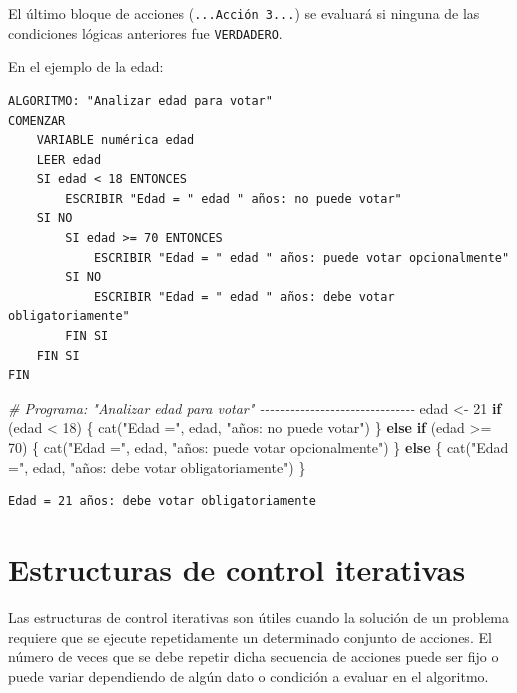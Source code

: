 \documentclass[
]{book}
\newenvironment{Shaded}{\begin{snugshade}}{\end{snugshade}}
\newcommand{\CommentTok}[1]{\textcolor[rgb]{0.56,0.35,0.01}{\textit{#1}}}
\newcommand{\ControlFlowTok}[1]{\textcolor[rgb]{0.13,0.29,0.53}{\textbf{#1}}}
\newcommand{\DecValTok}[1]{\textcolor[rgb]{0.00,0.00,0.81}{#1}}
\newcommand{\FunctionTok}[1]{\textcolor[rgb]{0.00,0.00,0.00}{#1}}
\newcommand{\NormalTok}[1]{#1}
\newcommand{\OtherTok}[1]{\textcolor[rgb]{0.56,0.35,0.01}{#1}}
\newcommand{\SpecialCharTok}[1]{\textcolor[rgb]{0.00,0.00,0.00}{#1}}
\newcommand{\StringTok}[1]{\textcolor[rgb]{0.31,0.60,0.02}{#1}}
\begin{document}
El último bloque de acciones (\texttt{...Acción\ 3...}) se evaluará si ninguna de las condiciones lógicas anteriores fue \texttt{VERDADERO}.

En el ejemplo de la edad:

\begin{verbatim}
ALGORITMO: "Analizar edad para votar"
COMENZAR
    VARIABLE numérica edad
    LEER edad
    SI edad < 18 ENTONCES
        ESCRIBIR "Edad = " edad " años: no puede votar"
    SI NO
        SI edad >= 70 ENTONCES
            ESCRIBIR "Edad = " edad " años: puede votar opcionalmente"
        SI NO
            ESCRIBIR "Edad = " edad " años: debe votar obligatoriamente"
        FIN SI
    FIN SI
FIN
\end{verbatim}

\begin{Shaded}
\begin{Highlighting}[]
\CommentTok{\# Programa: "Analizar edad para votar" {-}{-}{-}{-}{-}{-}{-}{-}{-}{-}{-}{-}{-}{-}{-}{-}{-}{-}{-}{-}{-}{-}{-}{-}{-}{-}{-}{-}{-}{-}{-}}
\NormalTok{edad }\OtherTok{\textless{}{-}} \DecValTok{21}
\ControlFlowTok{if}\NormalTok{ (edad }\SpecialCharTok{\textless{}} \DecValTok{18}\NormalTok{) \{}
    \FunctionTok{cat}\NormalTok{(}\StringTok{"Edad ="}\NormalTok{, edad, }\StringTok{"años: no puede votar"}\NormalTok{)}
\NormalTok{\} }\ControlFlowTok{else} \ControlFlowTok{if}\NormalTok{ (edad }\SpecialCharTok{\textgreater{}=} \DecValTok{70}\NormalTok{) \{}
    \FunctionTok{cat}\NormalTok{(}\StringTok{"Edad ="}\NormalTok{, edad, }\StringTok{"años: puede votar opcionalmente"}\NormalTok{)}
\NormalTok{\} }\ControlFlowTok{else}\NormalTok{ \{}
    \FunctionTok{cat}\NormalTok{(}\StringTok{"Edad ="}\NormalTok{, edad, }\StringTok{"años: debe votar obligatoriamente"}\NormalTok{)}
\NormalTok{\}}
\end{Highlighting}
\end{Shaded}

\begin{verbatim}
Edad = 21 años: debe votar obligatoriamente
\end{verbatim}

\hypertarget{estructuras-de-control-iterativas}{%
\section{Estructuras de control iterativas}\label{estructuras-de-control-iterativas}}

Las estructuras de control iterativas son útiles cuando la solución de un problema requiere que se ejecute repetidamente un determinado conjunto de acciones. El número de veces que se debe repetir dicha secuencia de acciones puede ser fijo o puede variar dependiendo de algún dato o condición a evaluar en el algoritmo.
\end{document}
